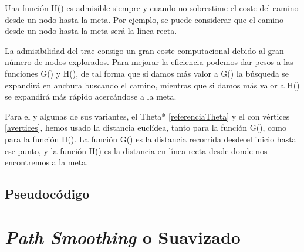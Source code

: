 Una función H() es admisible siempre y cuando no sobrestime el coste del camino desde un nodo hasta la meta. Por ejemplo, se puede considerar que el camino desde un nodo hasta la meta será la línea recta.

La admisibilidad del \Astar trae consigo un gran coste computacional debido al gran número de nodos explorados. Para mejorar la eficiencia podemos dar pesos a las funciones G() y H(), de tal forma que si damos más valor a G() la búsqueda se expandirá en anchura buscando el camino, mientras que si damos más valor a H() se expandirá más rápido acercándose a la meta.

Para el \Astar y algunas de sus variantes, el Theta* \ref{referenciaTheta} y el \Astar con vértices \ref{avertices}, hemos usado la distancia euclídea, tanto para la función G(), como para la función H(). La función G() es la distancia recorrida desde el inicio hasta ese punto, y la función H() es la distancia en línea recta desde donde nos encontremos a la meta.

\subsection{Pseudocódigo \Astar}

\section{\textit{Path Smoothing} o Suavizado}

